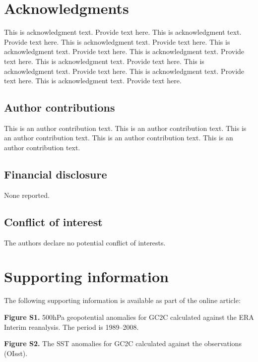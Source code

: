 \documentclass[AMA]{WileyNJD-v1}
\begin{document}

\section*{Acknowledgments}
This is acknowledgment text.\cite{Kenamond_Burton-Exact_remap_MM_poly-Multimat_SF-Pres13} Provide text here. This is acknowledgment text. Provide text here. This is acknowledgment text. Provide text here. This is acknowledgment text. Provide text here. This is acknowledgment text. Provide text here. This is acknowledgment text. Provide text here. This is acknowledgment text. Provide text here. This is acknowledgment text. Provide text here. This is acknowledgment text. Provide text here. 

\subsection*{Author contributions}

This is an author contribution text. This is an author contribution text. This is an author contribution text. This is an author contribution text. This is an author contribution text. 

\subsection*{Financial disclosure}

None reported.

\subsection*{Conflict of interest}

The authors declare no potential conflict of interests.


\section*{Supporting information}

The following supporting information is available as part of the online article:

\noindent
\textbf{Figure S1.}
{500{\uns}hPa geopotential anomalies for GC2C calculated against the ERA Interim reanalysis. The period is 1989--2008.}

\noindent
\textbf{Figure S2.}
{The SST anomalies for GC2C calculated against the observations (OIsst).}


\appendix
\end{document}
